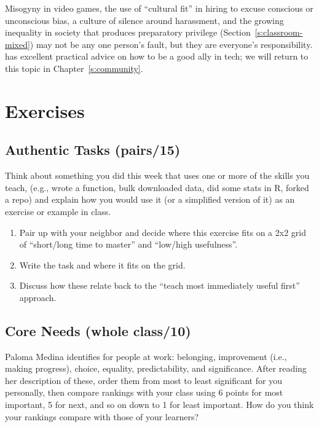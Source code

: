 Misogyny in video games, the use of ``cultural fit'' in hiring to excuse
conscious or unconscious bias, a culture of silence around harassment,
and the growing inequality in society that produces preparatory
privilege (Section~\ref{s:classroom-mixed}) may not be any one person's
fault, but they are everyone's responsibility.  has excellent practical advice on how to be
a good ally in tech; we will return to this topic in
Chapter~\ref{s:community}.

\section{Exercises}\label{s:motivation-exercises}

\subsection*{Authentic Tasks (pairs/15)}

Think about something you did this week that uses one or more of the
skills you teach, (e.g., wrote a function, bulk downloaded data, did
some stats in R, forked a repo) and explain how you would use it (or a
simplified version of it) as an exercise or example in class.

\begin{enumerate}
\item
  Pair up with your neighbor and decide where this exercise fits on a
  2x2 grid of ``short/long time to master'' and ``low/high
  usefulness''.
\item
  Write the task and where it fits on the grid.
\item
  Discuss how these relate back to the ``teach most immediately useful
  first'' approach.
\end{enumerate}

\subsection*{Core Needs (whole class/10)}

Paloma Medina identifies  for people at
work: belonging, improvement (i.e., making progress), choice,
equality, predictability, and significance. After reading her
description of these, order them from most to least significant for
you personally, then compare rankings with your class using 6 points
for most important, 5 for next, and so on down to 1 for least
important. How do you think your rankings compare with those of your
learners?

